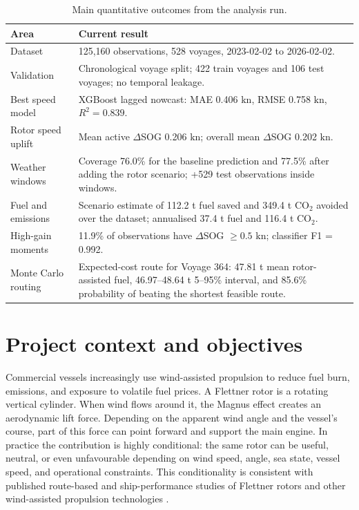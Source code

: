 \documentclass[10pt,a4paper]{article}
\newcommand{\kn}{\ensuremath{\mathrm{kn}}}
\newcommand{\co}{CO$_2$}
\newcommand{\sog}{SOG}
\begin{document}
\begin{table}[H]
\centering
\caption{Main quantitative outcomes from the analysis run.}
\begin{tabularx}{\textwidth}{>{\raggedright\arraybackslash}p{}X}
\toprule
\textbf{Area} & \textbf{Current result} \\
\midrule
Dataset & 125,160 observations, 528 voyages, 2023-02-02 to 2026-02-02. \\
Validation & Chronological voyage split; 422 train voyages and 106 test voyages; no temporal leakage. \\
Best speed model & XGBoost lagged nowcast: MAE 0.406 \kn{}, RMSE 0.758 \kn{}, $R^2=0.839$. \\
Rotor speed uplift & Mean active $\Delta$\sog{} 0.206 \kn{}; overall mean $\Delta$\sog{} 0.202 \kn{}. \\
Weather windows & Coverage 76.0\% for the baseline prediction and 77.5\% after adding the rotor scenario; +529 test observations inside windows. \\
Fuel and emissions & Scenario estimate of 112.2 t fuel saved and 349.4 t \co{} avoided over the dataset; annualised 37.4 t fuel and 116.4 t \co{}. \\
High-gain moments & 11.9\% of observations have $\Delta$\sog{} $\geq 0.5$ \kn{}; classifier F1 = 0.992. \\
Monte Carlo routing & Expected-cost route for Voyage 364: 47.81 t mean rotor-assisted fuel, 46.97--48.64 t 5--95\% interval, and 85.6\% probability of beating the shortest feasible route. \\
\bottomrule
\end{tabularx}
\end{table}

\section{Project context and objectives}

Commercial vessels increasingly use wind-assisted propulsion to reduce fuel
burn, emissions, and exposure to volatile fuel prices. A Flettner rotor is a
rotating vertical cylinder. When wind flows around it, the Magnus effect creates
an aerodynamic lift force. Depending on the apparent wind angle and the vessel's
course, part of this force can point forward and support the main engine. In
practice the contribution is highly conditional: the same rotor can be useful,
neutral, or even unfavourable depending on wind speed, angle, sea state, vessel
speed, and operational constraints. This conditionality is consistent with
published route-based and ship-performance studies of Flettner rotors and other
wind-assisted propulsion technologies \cite{traut2014flettner,lu2020wasp}.
\end{document}
